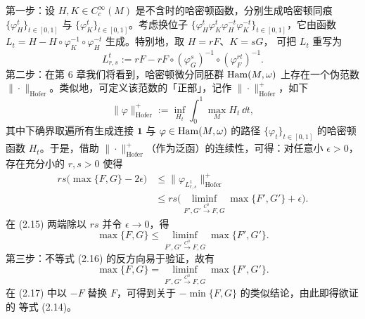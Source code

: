第一步：设 $H,K\in C_c^\infty(M)$ 是不含时的哈密顿函数，分别生成哈密顿同痕
$\{\varphi_H^t\}_{t\in[0,1]}$ 与 $\{\varphi_K^t\}_{t\in[0,1]}$。考虑换位子
$\{\varphi_H^t\varphi_K^t\varphi_H^{-t}\varphi_K^{-t}\}_{t\in[0,1]}$，它由函数
$L_t=H-H\circ\varphi_K^{-1}\circ\varphi_H^{-t}$ 生成。特别地，取 $H=rF$、$K=sG$，
可把 $L_t$ 重写为
\[
  L_{r,s}^t:=rF-rF\circ(\varphi_G^s)^{-1}\circ(\varphi_F^{rt})^{-1}.
\]
第二步：在第 6 章我们将看到，哈密顿微分同胚群 $\operatorname{Ham}(M,\omega)$ 上存在一个伪范数
$\|\cdot\|_{\mathrm{Hofer}}$。类似地，可定义该范数的「正部」，记作
$\|\cdot\|_{\mathrm{Hofer}}^+$，如下
\[
  \|\varphi\|_{\mathrm{Hofer}}^+
  :=\inf_{H_t}\int_0^1\max_MH_t\,\dd t,
\]
其中下确界取遍所有生成连接 $\mathbf{1}$ 与 $\varphi\in\operatorname{Ham}(M,\omega)$ 的路径
$\{\varphi_t\}_{t\in[0,1]}$ 的哈密顿函数 $H_t$。于是，借助
$\|\cdot\|_{\mathrm{Hofer}}^+$（作为泛函）的连续性，可得：对任意小 $\epsilon>0$，
存在充分小的 $r,s>0$ 使得
\begin{equation}
  \begin{aligned}
    rs\big(\max\{F,G\}-2\epsilon\big)
    &\le\big\|\varphi_{L_{r,s}^1}\big\|_{\mathrm{Hofer}}^+\\
    &\le rs\Big(\liminf_{F',G'\xrightarrow{C^0}F,G}\max\{F',G'\}+\epsilon\Big).
  \end{aligned}
  \tag{2.15}
\end{equation}
在 (2.15) 两端除以 $rs$ 并令 $\epsilon\to0$，得
\begin{equation}
  \max\{F,G\}\le\liminf_{F',G'\xrightarrow{C^0}F,G}\max\{F',G'\}.
  \tag{2.16}
\end{equation}
第三步：不等式 (2.16) 的反方向易于验证，故有
\begin{equation}
  \max\{F,G\}=\liminf_{F',G'\xrightarrow{C^0}F,G}\max\{F',G'\}.
  \tag{2.17}
\end{equation}
在 (2.17) 中以 $-F$ 替换 $F$，可得到关于 $-\min\{F,G\}$ 的类似结论，由此即得欲证的
等式 (2.14)。

